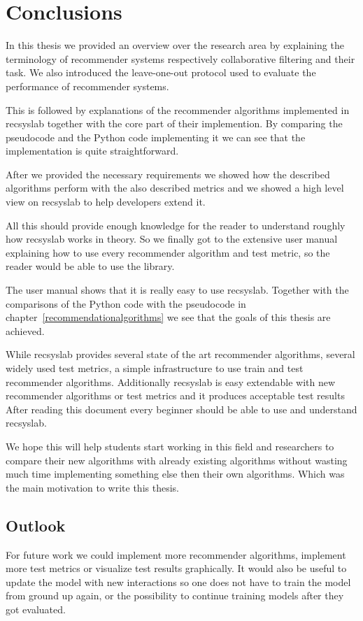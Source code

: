 
\chapter{Conclusions}
In this thesis we provided an overview over the research area by
explaining the terminology of recommender systems respectively
collaborative filtering and their task. We also introduced the leave-one-out
protocol used to evaluate the performance of recommender systems.

This is followed by explanations of the recommender algorithms implemented in recsyslab
together with the core part of their implemention. By comparing the pseudocode
and the Python code implementing it we can see that the implementation is quite
straightforward.

After we provided the necessary requirements we showed how the described algorithms
perform with the also described metrics and we showed a high level view on 
recsyslab to help developers extend it.

All this should provide enough knowledge for
the reader to understand roughly how recsyslab works in theory.
So we finally got to the extensive user manual 
explaining how to use every recommender algorithm and test metric, so the reader
would be able to use the library.

The user manual shows that it is really easy to use recsyslab.
Together with the comparisons of the Python code with the pseudocode
in chapter~\ref{recommendationalgorithms} we see that the goals of
this thesis are achieved.

While recsyslab provides several state of the art recommender algorithms,
several widely used test metrics, a simple infrastructure to use train and test
recommender algorithms. Additionally recsyslab is easy extendable with new 
recommender algorithms or test metrics and it produces acceptable test results
After reading this document every beginner should be able to use and understand recsyslab.

We hope this will help students start working in this field and researchers to compare their new algorithms
with already existing algorithms without wasting much time implementing something else
then their own algorithms. Which was the main motivation to write this thesis.


\section{Outlook}
For future work we could implement more recommender algorithms,
implement more test metrics or visualize test results graphically.
It would also be useful to update the model with new interactions so 
one does not have to train the model from ground up again, or the 
possibility to continue training models after they got evaluated.

